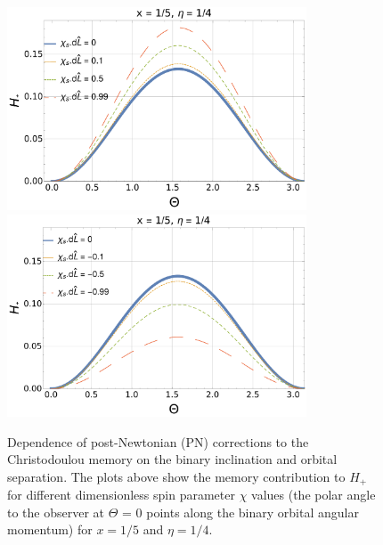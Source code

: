 \documentclass[twocolumn,showpacs,aps,prd,nobibnotes,floatfix]{revtex4-1}
\begin{document}
\begin{figure}
	\includegraphics[width=3.5in]{../plots/PNmemorycontributionHpAlginedSpinAngular.pdf}
	\includegraphics[width=3.5in]{../plots/PNmemorycontributionHpAntiAlginedSpinAngular.pdf}
	\caption{Dependence of post-Newtonian (PN) corrections to the Christodoulou memory on the binary inclination and orbital separation. The plots above show the memory contribution to $H_+$ for different dimensionless spin parameter $\chi$ values (the polar angle to the observer at $\Theta$ = 0 points along the binary orbital angular momentum) for $x = 1/5$ and $\eta=1/4$.}
\end{figure}
\end{document}
